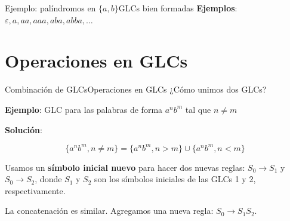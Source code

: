 \documentclass[spanish]{beamer}
\begin{document}
\begin{frame}{Ejemplo: palíndromos en $\{a,b\}$}{GLCs bien formadas}
    \textbf{Ejemplos}: $\varepsilon, a, aa, aaa, aba, abba, \dots$ \pause

    \bigskip






\end{frame}

\section{Operaciones en GLCs}

\begin{frame}{Combinación de GLCs}{Operaciones en GLCs}
    ¿Cómo \alert{unimos} dos GLCs? \pause

    \bigskip

    \textbf{Ejemplo}: GLC para las palabras de forma $a^nb^m$ tal que $n \neq m$ \pause

    \bigskip

    \textbf{Solución}:

    $$\{a^n b^m, n \neq m\} = \{a^n b^m, n > m\} \cup \{a ^n b ^m, n < m\}$$ \pause

    Usamos un \textbf{símbolo inicial nuevo} para hacer dos nuevas reglas: $S_0 \to S_1$ y $S_0 \to S_2$, donde $S_1$ y $S_2$ son los símbolos iniciales de las GLCs 1 y 2, respectivamente. \pause

    \bigskip

    La \alert{concatenación} es similar. Agregamos una nueva regla: $S_0 \to S_1S_2$.
\end{frame}
\end{document}
